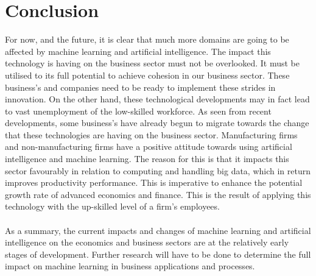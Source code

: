 \documentclass{article}
\begin{document}
\section{Conclusion}
For now, and the future, it is clear that much more domains are going to be affected by machine learning and artificial intelligence. The impact this technology is having on the business sector must not be overlooked. It must be utilised to its full potential to achieve cohesion in our business sector.\cite{12899299820180101} These business's and companies need to be ready to implement these strides in innovation. On the other hand, these technological developments may in fact lead to vast unemployment of the low-skilled workforce. As seen from recent developments, some business's have already begun to migrate towards the change that these technologies are having on the business sector.\cite{S187704281503613720150703} Manufacturing firms and non-manufacturing firms have a positive attitude towards using artificial intelligence and machine learning. The reason for this is that it impacts this sector favourably in relation to computing and handling big data, which in return improves productivity performance. This is imperative to enhance the potential growth rate of advanced economics and finance. This is the result of applying this technology with the up-skilled level of a firm's employees.\cite{12165921920170401}
\\\\
As a summary, the current impacts and changes of machine learning and artificial intelligence on the economics and business sectors are at the relatively early stages of development.\cite{S187704281503613720150703} Further research will have to be done to determine the full impact on machine learning in business applications and processes.


%

% 
\end{document}
